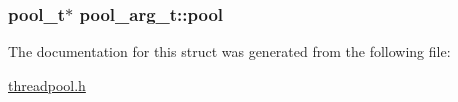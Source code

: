 \subsubsection[{pool}]{\setlength{\rightskip}{0pt plus 5cm}pool\+\_\+t$\ast$ pool\+\_\+arg\+\_\+t\+::pool}\label{structpool__arg_aaee1659dd06b0712e063bc0d95cb7175}


The documentation for this struct was generated from the following file\+:\begin{DoxyCompactItemize}
\item 
\hyperlink{threadpool_8h}{threadpool.\+h}\end{DoxyCompactItemize}
